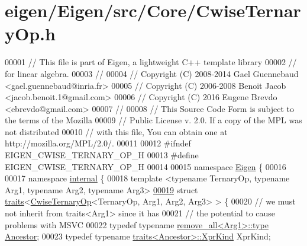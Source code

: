 \hypertarget{eigen_2_eigen_2src_2_core_2_cwise_ternary_op_8h_source}{}\section{eigen/\+Eigen/src/\+Core/\+Cwise\+Ternary\+Op.h}
\label{eigen_2_eigen_2src_2_core_2_cwise_ternary_op_8h_source}

\begin{DoxyCode}
00001 \textcolor{comment}{// This file is part of Eigen, a lightweight C++ template library}
00002 \textcolor{comment}{// for linear algebra.}
00003 \textcolor{comment}{//}
00004 \textcolor{comment}{// Copyright (C) 2008-2014 Gael Guennebaud <gael.guennebaud@inria.fr>}
00005 \textcolor{comment}{// Copyright (C) 2006-2008 Benoit Jacob <jacob.benoit.1@gmail.com>}
00006 \textcolor{comment}{// Copyright (C) 2016 Eugene Brevdo <ebrevdo@gmail.com>}
00007 \textcolor{comment}{//}
00008 \textcolor{comment}{// This Source Code Form is subject to the terms of the Mozilla}
00009 \textcolor{comment}{// Public License v. 2.0. If a copy of the MPL was not distributed}
00010 \textcolor{comment}{// with this file, You can obtain one at http://mozilla.org/MPL/2.0/.}
00011 
00012 \textcolor{preprocessor}{#ifndef EIGEN\_CWISE\_TERNARY\_OP\_H}
00013 \textcolor{preprocessor}{#define EIGEN\_CWISE\_TERNARY\_OP\_H}
00014 
00015 \textcolor{keyword}{namespace }\hyperlink{namespace_eigen}{Eigen} \{
00016 
00017 \textcolor{keyword}{namespace }\hyperlink{namespaceinternal}{internal} \{
00018 \textcolor{keyword}{template} <\textcolor{keyword}{typename} TernaryOp, \textcolor{keyword}{typename} Arg1, \textcolor{keyword}{typename} Arg2, \textcolor{keyword}{typename} Arg3>
\hyperlink{struct_eigen_1_1internal_1_1traits_3_01_cwise_ternary_op_3_01_ternary_op_00_01_arg1_00_01_arg2_00_01_arg3_01_4_01_4}{00019} \textcolor{keyword}{struct }\hyperlink{struct_eigen_1_1internal_1_1traits}{traits}<\hyperlink{group___core___module_class_eigen_1_1_cwise_ternary_op}{CwiseTernaryOp}<TernaryOp, Arg1, Arg2, Arg3> > \{
00020   \textcolor{comment}{// we must not inherit from traits<Arg1> since it has}
00021   \textcolor{comment}{// the potential to cause problems with MSVC}
00022   \textcolor{keyword}{typedef} \textcolor{keyword}{typename} \hyperlink{group___sparse_core___module}{remove\_all<Arg1>::type} \hyperlink{group___sparse_core___module}{Ancestor};
00023   \textcolor{keyword}{typedef} \textcolor{keyword}{typename} \hyperlink{struct_eigen_1_1internal_1_1traits}{traits<Ancestor>::XprKind} XprKind;

\end{DoxyCode}
